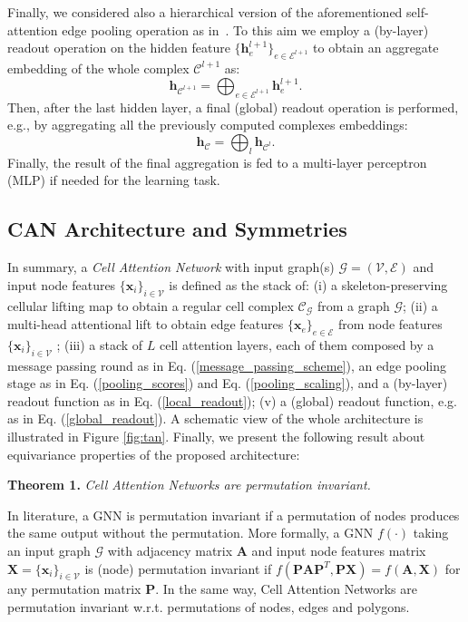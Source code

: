 \documentclass{article}
\begin{document}
Finally, we considered also a hierarchical version of the aforementioned self-attention edge pooling operation as in~\cite{cangea2018towards}. To this aim we employ a (by-layer) readout operation on the hidden feature  $\{\mathbf{h}_e^{l+1}\}_{e \in \mathcal{E}^{l+1}}$ to obtain an aggregate embedding of the whole complex $\mathcal{C}^{l+1}$ as:
\begin{equation}\label{local_readout}
    \mathbf{h}_{\mathcal{C}^{l+1}} = \bigoplus_{e \in \mathcal{E}^{l+1}}  \mathbf{h}_{e}^{l+1}.
\end{equation} 
Then, after the last hidden layer, a final (global) readout operation is performed, e.g., by aggregating all the previously computed complexes embeddings: 
\begin{equation}\label{global_readout}
\mathbf{h}_{\mathcal{C}} = \bigoplus_{l} \mathbf{h}_{\mathcal{C}^{l}}.
\end{equation}
Finally, the result of the final aggregation is fed to a multi-layer perceptron (MLP) if needed for the learning task.



\subsection{CAN Architecture and Symmetries}
In summary, a \emph{Cell Attention Network} with input graph(s) $\mathcal{G}=(\mathcal{V},\mathcal{E})$ and input node features $\{\mathbf{x}_i\}_{i \in \mathcal{V}}$ is defined as the stack of: (i) a skeleton-preserving cellular lifting map to obtain a regular cell complex $\mathcal{C}_{\mathcal{G}}$ from a graph $\mathcal{G}$; (ii) a multi-head attentional lift to obtain edge features $\{\mathbf{x}_e\}_{e \in \mathcal{E}}$ from node features $\{\mathbf{x}_i\}_{i \in \mathcal{V}}$ ; (iii) a stack of $L$ cell attention layers, each of them composed by a message passing round as in Eq. (\ref{message_passing_scheme}), an edge pooling stage as in Eq. (\ref{pooling_scores}) and Eq. (\ref{pooling_scaling}), and a (by-layer) readout function as in Eq. (\ref{local_readout}); (v) a (global) readout function, e.g. as in Eq. (\ref{global_readout}). A schematic view of the whole architecture is illustrated in Figure \ref{fig:tan}. Finally, we present the following result about equivariance properties of the proposed architecture:

\textbf{Theorem 1.} \textit{Cell Attention Networks are permutation invariant.}

In literature, a GNN is permutation invariant if a permutation of  nodes produces the same output without the permutation. More formally, a GNN $f(\cdot)$ taking an input graph $\mathcal{G}$ with adjacency matrix $\mathbf{A}$ and input node features matrix $\mathbf{X} = \{\mathbf{x}_i\}_{i \in \mathcal{V}}$ is (node) permutation invariant if $ f(\mathbf{P}\mathbf{A}\mathbf{P}^T,\mathbf{P}\mathbf{X}) = f(\mathbf{A},\mathbf{X})$ for any permutation matrix $\mathbf{P}$. In the same way, Cell Attention Networks are permutation invariant w.r.t. permutations of nodes, edges and polygons. 
\end{document}
